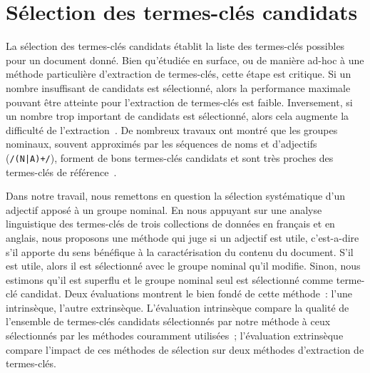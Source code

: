   \section{Sélection des termes-clés candidats}
  \label{sec:main:domain_independent_keyphrase_extraction-keyphrase_candidate_selection}
    La sélection des termes-clés candidats établit la liste des termes-clés
    possibles pour un document donné. Bien qu'étudiée en surface, ou de manière
    ad-hoc à une méthode particulière d'extraction de termes-clés, cette étape
    est critique. Si un nombre insuffisant de candidats est sélectionné, alors
    la performance maximale pouvant être atteinte pour l'extraction de
    termes-clés est faible. Inversement, si un nombre trop important de
    candidats est sélectionné, alors cela augmente la difficulté de l'extraction~\cite{hasan2014state_of_the_art}.
    De nombreux travaux ont montré que les groupes nominaux, souvent
    approximés par les séquences de noms et d'adjectifs (\texttt{/(N|A)+/}),
    forment de bons termes-clés candidats et sont très proches des termes-clés
    de
    référence~\cite{barker2000nounphrasehead,hulth2003keywordextraction,wan2008expandrank}.

    Dans notre travail, nous remettons en question la sélection systématique
    d'un adjectif apposé à un groupe nominal. En nous appuyant sur une analyse
    linguistique des termes-clés de trois collections de données en français et
    en anglais, nous proposons une méthode qui juge si un adjectif est utile,
    c'est-a-dire s'il apporte du sens bénéfique à la caractérisation du contenu
    du document. S'il est utile, alors il est sélectionné avec le groupe nominal
    qu'il modifie. Sinon, nous estimons qu'il est superflu et le groupe nominal
    seul est sélectionné comme terme-clé candidat.
    Deux évaluations montrent le bien fondé de cette méthode~: l'une
    intrinsèque, l'autre extrinsèque. L'évaluation intrinsèque compare la
    qualité de l'ensemble de termes-clés candidats sélectionnés par notre
    méthode à ceux sélectionnés par les méthodes couramment utilisées~;
    l'évaluation extrinsèque compare l'impact de ces méthodes de sélection sur
    deux méthodes d'extraction de termes-clés.


